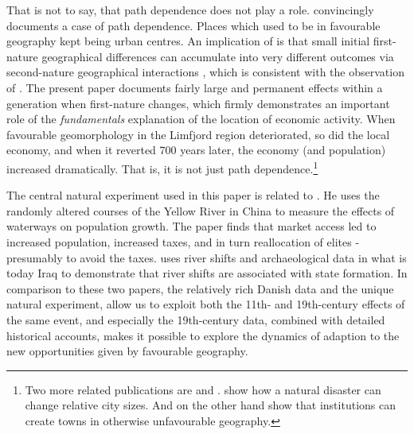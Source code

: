 \documentclass[11pt]{article}
\begin{document}
That is not to say, that path dependence does not play a role. \cite{Bleakley2012} convincingly documents a case of path dependence. Places which used to be in favourable geography kept being urban centres. An implication of \cite{Krugman1991} is that small initial first-nature geographical differences can accumulate into very different outcomes via second-nature geographical interactions \citep{Caruana-Galizia_Okubo_Wolf_2021}, which is consistent with the observation of \cite{Bleakley2012}. The present paper documents fairly large and permanent effects within a generation when first-nature changes, which firmly demonstrates an important role of the \textit{fundamentals} explanation of the location of economic activity. When favourable geomorphology in the Limfjord region deteriorated, so did the local economy, and when it reverted 700 years later, the economy (and population) increased dramatically. That is, it is not just path dependence.\footnote{Two more related publications are \cite{Ager2020a} and \cite{Cermeno2019}. \cite{Ager2020a} show how a natural disaster can change relative city sizes. And on the other hand \cite{Cermeno2019} show that institutions can create towns in otherwise unfavourable geography.}

The central natural experiment used in this paper is related to \citep{Seror2020Random}. He uses the randomly altered courses of the Yellow River in China to measure the effects of waterways on population growth. The paper finds that market access led to increased population, increased taxes, and in turn reallocation of elites - presumably to avoid the taxes. \citep{Allen2023} uses river shifts and archaeological data in what is today Iraq to demonstrate that river shifts are associated with state formation. In comparison to these two papers, the relatively rich Danish data and the unique natural experiment, allow us to exploit both the 11th- and 19th-century effects of the same event, and especially the 19th-century data, combined with detailed historical accounts, makes it possible to explore the dynamics of adaption to the new opportunities given by favourable geography. 
\end{document}
